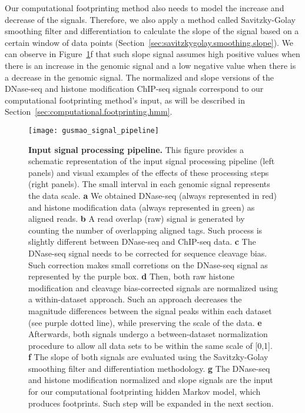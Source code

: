 Our computational footprinting method also needs to model the increase and decrease of the signals. Therefore, we also apply a method called Savitzky-Golay smoothing filter and differentiation to calculate the slope of the signal based on a certain window of data points (Section~\ref{sec:savitzkygolay.smoothing.slope}). We can observe in Figure~\ref{fig:gusmao_signal_pipeline}f that such slope signal assumes high positive values when there is an increase in the genomic signal and a low negative value when there is a decrease in the genomic signal. The normalized and slope versions of the DNase-seq and histone modification ChIP-seq signals correspond to our computational footprinting method's input, as will be described in Section~\ref{sec:computational.footprinting.hmm}.

\begin{figure}[h!]
\centering
\texttt{[image: gusmao\_signal\_pipeline]}
\caption[Input signal processing pipeline]{\textbf{Input signal processing pipeline.} This figure provides a schematic representation of the input signal processing pipeline (left panels) and visual examples of the effects of these processing steps (right panels). The small interval in each genomic signal represents the data scale. \textbf{a} We obtained DNase-seq (always represented in red) and histone modification data (always represented in green) as aligned reads. \textbf{b} A read overlap (raw) signal is generated by counting the number of overlapping aligned tags. Such process is slightly different between DNase-seq and ChIP-seq data.
 \textbf{c} The DNase-seq signal needs to be corrected for sequence cleavage bias. Such correction makes small corretions on the DNase-seq signal as represented by the purple box. \textbf{d} Then, both raw histone modification and cleavage bias-corrected signals are normalized using a within-dataset approach. Such an approach decreases the magnitude differences between the signal peaks within each dataset (see purple dotted line), while preserving the scale of the data. \textbf{e} Afterwards, both signals undergo a between-dataset normalization procedure to allow all data sets to be within the same scale of [0,1]. \textbf{f} The slope of both signals are evaluated using the Savitzky-Golay smoothing filter and differentiation methodology. \textbf{g} The DNase-seq and histone modification normalized and slope signals are the input for our computational footprinting hidden Markov model, which produces footprints. Such step will be expanded in the next section.}
\label{fig:gusmao_signal_pipeline}
\end{figure}

